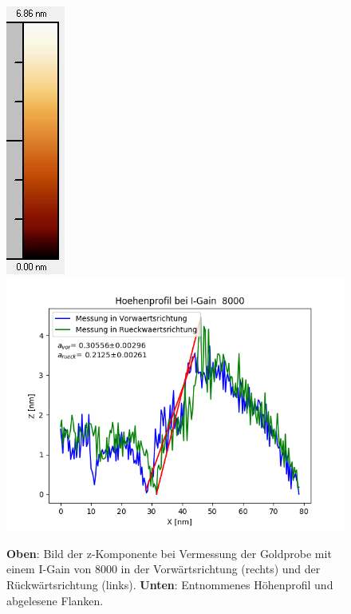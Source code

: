 \documentclass[12pt,a4paper]{article}
\begin{document}
\begin{figure}
\includegraphics[scale=0.6]{Bilder/Anhang/IGain/8000_IGain_nach_Skala.jpg}
\includegraphics[scale=0.6]{Bilder/Anhang/IGain/Profil_IGain_8000.png}
\caption{\textbf{Oben}: Bild der z-Komponente bei Vermessung der Goldprobe mit einem I-Gain von 8000 in der Vorwärtsrichtung (rechts) und der Rückwärtsrichtung (links). \textbf{Unten}: Entnommenes Höhenprofil und abgelesene Flanken.}
\end{figure}
\end{document}
